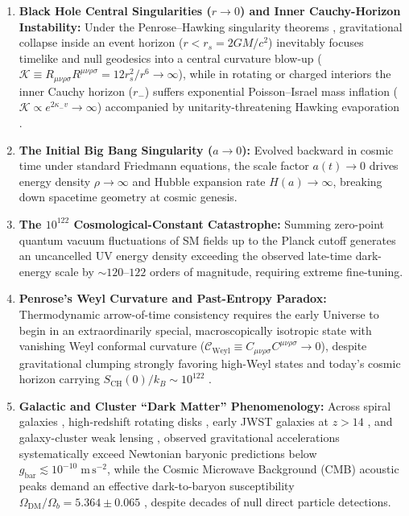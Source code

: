 \documentclass[11pt,a4paper]{article}
\theoremstyle{remark}
\begin{document}
\begin{enumerate}
  \item \textbf{Black Hole Central Singularities ($r \to 0$) and Inner Cauchy-Horizon Instability:} Under the Penrose--Hawking singularity theorems \cite{Penrose1965Singularity,HawkingEllis1973}, gravitational collapse inside an event horizon ($r < r_s = 2GM/c^2$) inevitably focuses timelike and null geodesics into a central curvature blow-up ($\mathcal{K} \equiv R_{\mu\nu\rho\sigma}R^{\mu\nu\rho\sigma} = 12r_s^2/r^6 \to \infty$), while in rotating or charged interiors the inner Cauchy horizon ($r_-$) suffers exponential Poisson--Israel mass inflation ($\mathcal{K} \propto e^{2\kappa_- v} \to \infty$) \cite{PoissonIsrael1990} accompanied by unitarity-threatening Hawking evaporation \cite{Hawking1975,Page1993}.
  \item \textbf{The Initial Big Bang Singularity ($a \to 0$):} Evolved backward in cosmic time under standard Friedmann equations, the scale factor $a(t) \to 0$ drives energy density $\rho \to \infty$ and Hubble expansion rate $H(a) \to \infty$, breaking down spacetime geometry at cosmic genesis.
  \item \textbf{The $10^{122}$ Cosmological-Constant Catastrophe:} Summing zero-point quantum vacuum fluctuations of SM fields up to the Planck cutoff generates an uncancelled UV energy density exceeding the observed late-time dark-energy scale by $\sim 120$--$122$ orders of magnitude, requiring extreme fine-tuning.
  \item \textbf{Penrose's Weyl Curvature and Past-Entropy Paradox:} Thermodynamic arrow-of-time consistency requires the early Universe to begin in an extraordinarily special, macroscopically isotropic state with vanishing Weyl conformal curvature ($\mathcal{C}_{\mathrm{Weyl}} \equiv C_{\mu\nu\rho\sigma}C^{\mu\nu\rho\sigma} \to 0$), despite gravitational clumping strongly favoring high-Weyl states and today's cosmic horizon carrying $S_{\mathrm{CH}}(0)/k_B \sim 10^{122}$ \cite{Penrose1979Weyl,GibbonsHawking1977}.
  \item \textbf{Galactic and Cluster ``Dark Matter'' Phenomenology:} Across spiral galaxies \cite{Milgrom1983}, high-redshift rotating disks \cite{ManceraPina2025}, early JWST galaxies at $z > 14$ \cite{Carniani2024JADESz14}, and galaxy-cluster weak lensing \cite{EuclidOverview2025}, observed gravitational accelerations systematically exceed Newtonian baryonic predictions below $g_{\mathrm{bar}} \lesssim 10^{-10}\;\mathrm{m\,s^{-2}}$, while the Cosmic Microwave Background (CMB) acoustic peaks demand an effective dark-to-baryon susceptibility $\Omega_{\mathrm{DM}}/\Omega_b = 5.364 \pm 0.065$ \cite{Planck2018VI}, despite decades of null direct particle detections.

\end{enumerate}
\end{document}
